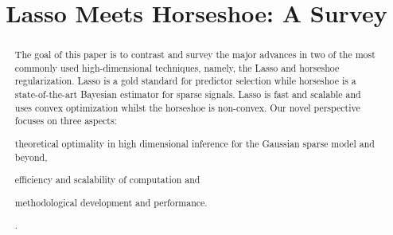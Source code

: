 \documentclass[sts,preprint]{imsart}
\begin{document}
\begin{frontmatter}

\title{Lasso Meets Horseshoe: A Survey}


\author{ }
\address{250 N. University St., West Lafayette, IN 47907. }
\vspace{-0.1in}
\author{  \corref{} }
\address{1 University of Arkansas, Fayetteville, AR 72704. }
\author{ }
\address{5807 S. Woodlawn Ave., Chicago, IL 60637. }
\author{ }
\address{5807 S. Woodlawn Ave., Chicago, IL 60637. }



\begin{abstract}
The goal of this paper is to contrast and survey the major advances in two of the most commonly used high-dimensional techniques, namely, the Lasso and horseshoe regularization. Lasso is a gold standard for predictor selection while horseshoe is a state-of-the-art Bayesian estimator for sparse signals. Lasso is fast and scalable and uses convex optimization whilst the horseshoe is non-convex.  Our novel perspective focuses on three aspects: 
\begin{enumerate*}
  \item theoretical optimality in high dimensional inference for the Gaussian
    sparse model and beyond, 
  \item efficiency and scalability of computation and 
  \item methodological development and performance. 
\end{enumerate*}. 
\end{abstract}


\end{frontmatter}
\end{document}
